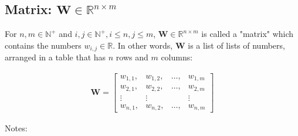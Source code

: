 \documentclass[titlepage]{article}
\begin{document}
      \subsection{Matrix: $\mathbf{W} \in \mathbb{R}^{n \times m}$}

        For $n, m \in \mathbb{N}^+$ and
        $i, j \in \mathbb{N}^+, i \leq n, j \leq m$,
        $\mathbf{W} \in \mathbb{R}^{n \times m}$ is called a "matrix" which
        contains the numbers $w_{i, j} \in \mathbb{R}$. In other words,
        $\mathbf{W}$ is a list of lists of numbers, arranged in a table that has
        $n$ rows and $m$ columns:

        \begin{align*}
          \mathbf{W}
            = \begin{bmatrix}
                w_{1,1}, & w_{1,2}, & \ldots, & w_{1,m} \\
                w_{2,1}, & w_{2,2}, & \ldots, & w_{2,m} \\
                \vdots & \vdots & & \vdots \\
                w_{n,1}, & w_{n,2}, & \ldots, & w_{n,m}
              \end{bmatrix}
        \end{align*}

        Notes:
\end{document}
